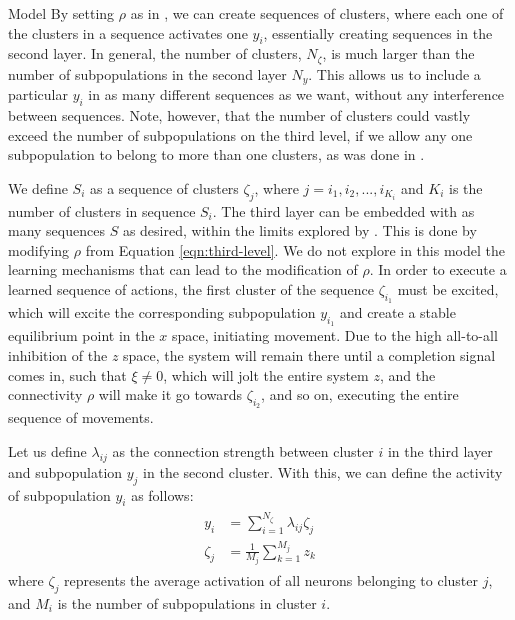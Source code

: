 \documentclass{report}
\def \eref #1{Equation \ref{#1}}   %
\begin{document}
\begin{chapter}{Model}
By setting $\rho$ as in \cite{CuevasRivera_Modelling_2015}, we can create sequences of clusters, where each one of the clusters in a sequence activates one $y_i$, essentially creating sequences in the second layer. In general, the number of clusters, $N_\zeta$, is much larger than the number of subpopulations in the second layer $N_y$. This allows us to include a particular $y_i$ in as many different sequences as we want, without any interference between sequences. Note, however, that the number of clusters could vastly exceed the number of subpopulations on the third level, if we allow any one subpopulation to belong to more than one clusters, as was done in \citep{CuevasRivera_Modelling_2015}.

We define $S_i$ as a sequence of clusters $\zeta_j$, where $j = i_1, i_2, ..., i_{K_i}$ and $K_i$ is the number of clusters in sequence $S_i$. The third layer can be embedded with as many sequences $S$ as desired, within the limits explored by \cite{CuevasRivera_Modelling_2015}. This is done by modifying $\rho$ from \eref{eqn:third-level}. We do not explore in this model the learning mechanisms that can lead to the modification of $\rho$. In order to execute a learned sequence of actions, the first cluster of the sequence $\zeta_{i_1}$ must be excited, which will excite the corresponding subpopulation $y_{i_1}$ and create a stable equilibrium point in the $x$ space, initiating movement. Due to the high all-to-all inhibition of the $z$ space, the system will remain there until a completion signal comes in, such that $\xi \ne 0$, which will jolt the entire system $z$, and the connectivity $\rho$ will make it go towards $\zeta_{i_2}$, and so on, executing the entire sequence of movements.

Let us define $\lambda_{ij}$ as the connection strength between cluster $i$ in the third layer and subpopulation $y_j$ in the second cluster. With this, we can define the activity of subpopulation $y_i$ as follows:
\begin{align}
  \begin{split}
  y_i &= \displaystyle\sum_{i = 1}^{N_\zeta} \lambda_{ij}\zeta_j \\ \label{eqn:second-level}
  \zeta_j &= \frac{1}{M_j}\displaystyle\sum_{k=1}^{M_j}z_k
  \end{split}
\end{align}
where $\zeta_j$ represents the average activation of all neurons belonging to cluster $j$, and $M_i$ is the number of subpopulations in cluster $i$.


\end{chapter}
\end{document}
